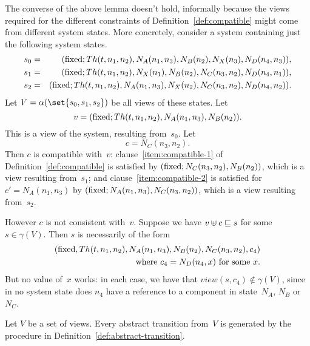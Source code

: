 The converse of the above lemma doesn't hold, informally because the views
required for the different constraints of Definition~\ref{def:compatible}
might come from different system states.  More concretely, consider a system
containing just the following system states.
%
\begin{eqnarray*}
s_0 & = &
   (\mathrm{fixed}; Th(t,n_1,n_2), N_A(n_1,n_3), N_B(n_2), N_X(n_3), N_D(n_4,n_3)), \\
s_1 & = &
  (\mathrm{fixed}; Th(t,n_1,n_2), N_X(n_1), N_B(n_2), N_C(n_3,n_2), N_D(n_4,n_1)),\\
s_2 & = & 
  (\mathrm{fixed}; Th(t,n_1,n_2), N_A(n_1,n_3), N_X(n_2), N_C(n_3,n_2), N_D(n_4,n_2)).
\end{eqnarray*}
%
Let $V = \alpha(\set{s_0,s_1,s_2})$ be all views of these states.  Let
\[
v = (\mathrm{fixed}; Th(t,n_1,n_2), N_A(n_1, n_3), N_B(n_2)).
\]
This is a view of the system, resulting from~$s_0$.  Let 
\[
c = N_C(n_3,n_2).
\]  
Then  $c$ is compatible with~$v$:
%
clause~\ref{item:compatible-1} of Definition~\ref{def:compatible} is satisfied
by $(\mathrm{fixed}; N_C(n_3,n_2), N_B(n_2))$, which is a view resulting
from~$s_1$;
%
and clause~\ref{item:compatible-2} is satisfied for $c' = N_A(n_1,n_3)$ by
$(\mathrm{fixed}; N_A(n_1, n_3), N_C(n_3,n_2))$, which is a view resulting
from~$s_2$. 


However $c$ is not consistent with~$v$.  Suppose we have \( v \uplus
c \sqsubseteq s \) for some $s \in \gamma(V)$.  Then $s$ is necessarily of the form
\[
\begin{align}
(\mathrm{fixed}, Th(t,n_1,n_2), N_A(n_1, n_3), N_B(n_2), N_C(n_3,n_2), c_4) \\
\qquad \mbox{where $c_4 = N_D(n_4,x)$ for some $x$.}
\end{align}
\]
But no value of~$x$ works: in each case, we have that $view(s, c_4) \nin
\gamma(V)$, since in no system state does $n_4$ have a reference to a
component in state~$N_A$, $N_B$ or~$N_C$.



\begin{prop}
\label{lem:abstract-transitions-sound}
Let $V$ be a set of views.  Every abstract transition from~$V$ is generated by
the procedure in Definition~\ref{def:abstract-transition}.
\end{prop}

